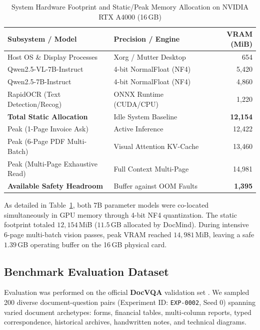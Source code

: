 \documentclass[conference]{IEEEtran}
\begin{document}
{\begin{table}[htbp]
\caption{System Hardware Footprint and Static/Peak Memory Allocation on NVIDIA RTX A4000 (16\,GB)}
\label{tab:hardware}
\begin{center}
\begin{tabular}{llr}
\toprule
\textbf{Subsystem / Model} & \textbf{Precision / Engine} & \textbf{VRAM (MiB)} \\
\midrule
Host OS \& Display Processes & Xorg / Mutter Desktop & 654 \\
Qwen2.5-VL-7B-Instruct & 4-bit NormalFloat (NF4) & 5,420 \\
Qwen2.5-7B-Instruct & 4-bit NormalFloat (NF4) & 4,860 \\
RapidOCR (Text Detection/Recog) & ONNX Runtime (CUDA/CPU) & 1,220 \\
\midrule
\textbf{Total Static Allocation} & Idle System Baseline & \textbf{12,154} \\
\midrule
Peak (1-Page Invoice Ask) & Active Inference & 12,422 \\
Peak (6-Page PDF Multi-Batch) & Visual Attention KV-Cache & 13,460 \\
Peak (Multi-Page Exhaustive Read) & Full Context Multi-Page & 14,981 \\
\textbf{Available Safety Headroom} & Buffer against OOM Faults & \textbf{1,395} \\
\bottomrule
\end{tabular}
\end{center}
\end{table}

As detailed in Table~\ref{tab:hardware}, both 7B parameter models were co-located simultaneously in GPU memory through 4-bit NF4 quantization. The static footprint totaled $12,154$\,MiB ($11.5$\,GB allocated by DocMind). During intensive 6-page multi-batch vision passes, peak VRAM reached $14,981$\,MiB, leaving a safe $1.39$\,GB operating buffer on the 16\,GB physical card.

\subsection{Benchmark Evaluation Dataset}
Evaluation was performed on the official \textbf{DocVQA} validation set \cite{b1}. We sampled 200 diverse document-question pairs (Experiment ID: \texttt{EXP-0002}, Seed $0$) spanning varied document archetypes: forms, financial tables, multi-column reports, typed correspondence, historical archives, handwritten notes, and technical diagrams.

}
\end{document}
